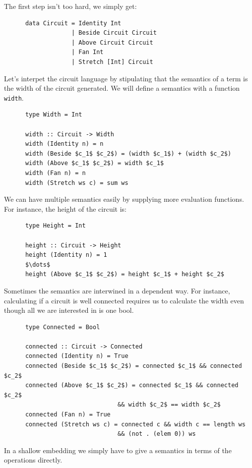 \documentclass[a4paper,12pt]{article}
\theoremstyle{remark}
\begin{document}
  The first step isn't too hard, we simply get:

  \begin{lstlisting}
      data Circuit = Identity Int
                   | Beside Circuit Circuit
                   | Above Circuit Circuit
                   | Fan Int
                   | Stretch [Int] Circuit  \end{lstlisting}

  Let's interpet the circuit language by stipulating that the semantics of a term is
  the width of the circuit generated. We will define a semantics with a function \lstinline{width}.

  \begin{lstlisting}
      type Width = Int

      width :: Circuit -> Width
      width (Identity n) = n
      width (Beside $c_1$ $c_2$) = (width $c_1$) + (width $c_2$)
      width (Above $c_1$ $c_2$) = width $c_1$
      width (Fan n) = n
      width (Stretch ws c) = sum ws  \end{lstlisting}

  We can have multiple semantics easily by supplying more evaluation functions. For
  instance, the height of the circuit is:

  \begin{lstlisting}
      type Height = Int

      height :: Circuit -> Height
      height (Identity n) = 1
      $\dots$
      height (Above $c_1$ $c_2$) = height $c_1$ + height $c_2$  \end{lstlisting}

  Sometimes the semantics are interwined in a dependent way. For instance, calculating
  if a circuit is well connected requires us to calculate the width even though all
  we are interested in is one bool.

  \begin{lstlisting}
      type Connected = Bool

      connected :: Circuit -> Connected
      connected (Identity n) = True
      connected (Beside $c_1$ $c_2$) = connected $c_1$ && connected $c_2$
      connected (Above $c_1$ $c_2$) = connected $c_1$ && connected $c_2$
                                && width $c_2$ == width $c_2$
      connected (Fan n) = True
      connected (Stretch ws c) = connected c && width c == length ws
                                && (not . (elem 0)) ws  \end{lstlisting}

  In a shallow embedding we simply have to give a semantics in terms of the operations
  directly.
\end{document}
